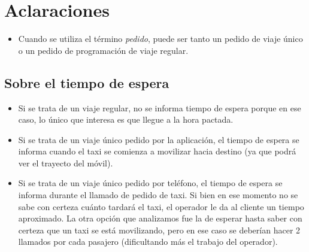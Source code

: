 \documentclass[a4paper]{artcle}
\begin{document}
\newtheorem{teo}{Teorema}[section]
\newtheorem{propo}{Proposici\'{o}n}[section]
\newtheorem{lema}{Lema}[section]
\newtheorem{coro}{Corolario}[section]
\newtheorem{defi}{Definici\'{o}n}[section]

\newpage
\thispagestyle{empty}
\tableofcontents

\parskip=5pt
\setlength{\parindent}{0pt}

\newpage
\setcounter{page}{1}
\pagestyle{plain}

\newpage


\newcommand{\Asig}{\ensuremath{\leftarrow}}
\newcommand{\AndY}{\ensuremath{\wedge}}
\newcommand{\Or}{\ensuremath{\vee}}
\newcommand{\Not}{\ensuremath{\neg}}
\newcommand{\NotEq}{\ensuremath{\neq}}
\newcommand{\MayorIg}{\ensuremath{\geq}}
\newcommand{\tabu}{\hspace*{0.7cm}}
\newcommand{\ctabu}{\hspace*{0.8cm}}
\newcommand{\htabu}{\hspace*{0.35cm}}
\newcommand{\moduloNombre}[1]{\textbf{#1}}

\section{Aclaraciones}
\begin{itemize}
\item Cuando se utiliza el t\'ermino \textit{pedido}, puede ser tanto un pedido de viaje \'unico o un pedido de programaci\'on
de viaje regular.
\end{itemize}

\subsection{Sobre el tiempo de espera}
\begin{itemize}
\item Si se trata de un viaje regular, no se informa tiempo de espera porque en ese caso, lo \'unico que interesa es que llegue
a la hora pactada.
\item Si se trata de un viaje \'unico pedido por la aplicaci\'on, el tiempo de espera se informa cuando el taxi se comienza a movilizar
hacia destino (ya que podr\'a ver el trayecto del m\'ovil).
\item Si se trata de un viaje \'unico pedido por tel\'efono, el tiempo de espera se informa durante el llamado de pedido de taxi.
Si bien en ese momento no se sabe con certeza cu\'anto tardar\'a el taxi, el operador le da al cliente un tiempo aproximado.
La otra opci\'on que analizamos fue la de esperar hasta saber con certeza que un taxi se est\'a movilizando, pero en ese caso
se deber\'ian hacer 2 llamados por cada pasajero (dificultando m\'as el trabajo del operador).
\end{itemize}
\end{document}
